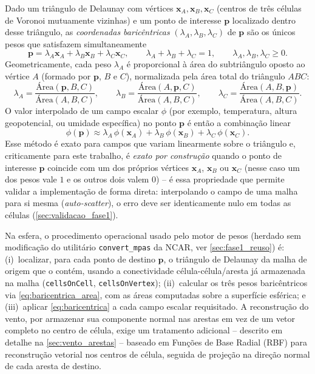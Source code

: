 Dado um triângulo de Delaunay com vértices $\mathbf{x}_A, \mathbf{x}_B,
\mathbf{x}_C$ (centros de três células de Voronoi mutuamente vizinhas) e
um ponto de interesse $\mathbf{p}$ localizado dentro desse triângulo, as
\emph{coordenadas baricêntricas} $(\lambda_A, \lambda_B, \lambda_C)$ de
$\mathbf{p}$ são os únicos pesos que satisfazem simultaneamente
\begin{equation}
  \mathbf{p} = \lambda_A \mathbf{x}_A + \lambda_B \mathbf{x}_B + \lambda_C \mathbf{x}_C,
  \qquad
  \lambda_A + \lambda_B + \lambda_C = 1,
  \qquad \lambda_A, \lambda_B, \lambda_C \ge 0.
  \label{eq:baricentrica_def}
\end{equation}
Geometricamente, cada peso $\lambda_A$ é proporcional à área do
subtriângulo oposto ao vértice $A$ (formado por $\mathbf{p}$, $B$ e $C$),
normalizada pela área total do triângulo $ABC$:
\begin{equation}
  \lambda_A = \frac{\text{Área}(\mathbf{p}, B, C)}{\text{Área}(A,B,C)},
  \qquad
  \lambda_B = \frac{\text{Área}(A, \mathbf{p}, C)}{\text{Área}(A,B,C)},
  \qquad
  \lambda_C = \frac{\text{Área}(A, B, \mathbf{p})}{\text{Área}(A,B,C)}.
  \label{eq:baricentrica_area}
\end{equation}
O valor interpolado de um campo escalar $\phi$ (por exemplo, temperatura,
altura geopotencial, ou umidade específica) no ponto $\mathbf{p}$ é então
a combinação linear
\begin{equation}
  \phi(\mathbf{p}) \approx \lambda_A\, \phi(\mathbf{x}_A) + \lambda_B\, \phi(\mathbf{x}_B) + \lambda_C\, \phi(\mathbf{x}_C).
  \label{eq:baricentrica}
\end{equation}
Esse método é exato para campos que variam linearmente sobre o triângulo
e, criticamente para este trabalho, é \emph{exato por construção} quando
o ponto de interesse $\mathbf{p}$ coincide com um dos próprios vértices
$\mathbf{x}_A$, $\mathbf{x}_B$ ou $\mathbf{x}_C$ (nesse caso um dos pesos
vale $1$ e os outros dois valem $0$) -- é essa propriedade que permite
validar a implementação de forma direta: interpolando o campo de uma
malha para si mesma (\emph{auto-\emph{scatter}}), o erro deve ser
identicamente nulo em todas as células (\cref{sec:validacao_fase1}).

Na esfera, o procedimento operacional usado pelo motor de pesos (herdado
sem modificação do utilitário \texttt{convert\_mpas} da NCAR, ver
\cref{sec:fase1_reuso}) é: (i)~localizar, para cada ponto de destino
$\mathbf{p}$, o triângulo de Delaunay da malha de origem que o contém,
usando a conectividade célula-célula/aresta já armazenada na malha
(\texttt{cellsOnCell}, \texttt{cellsOnVertex}); (ii)~calcular os três
pesos baricêntricos via \cref{eq:baricentrica_area}, com as áreas
computadas sobre a superfície esférica; e (iii)~aplicar
\cref{eq:baricentrica} a cada campo escalar requisitado. A reconstrução
do vento, por armazenar sua componente normal nas arestas em vez de um
vetor completo no centro de célula, exige um tratamento adicional --
descrito em detalhe na \cref{sec:vento_arestas} -- baseado em Funções de
Base Radial (RBF) para reconstrução vetorial nos centros de célula,
seguida de projeção na direção normal de cada aresta de destino.

